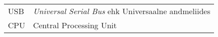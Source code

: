 \begin{longtable}{p{3cm}p{10cm}}
USB&\textit{Universal Serial Bus} ehk Universaalne andmeliides\\
CPU&Central Processing Unit\\
\end{longtable}
\addtocounter{table}{-1} 
